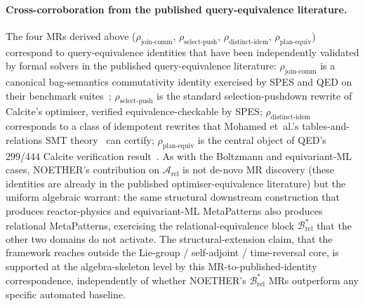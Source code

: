 \documentclass[manuscript]{acmart}
\begin{document}
\paragraph{Cross-corroboration from the published query-equivalence literature.}
The four MRs derived above ($\rho_{\mathrm{join\text{-}comm}}$, $\rho_{\mathrm{select\text{-}push}}$, $\rho_{\mathrm{distinct\text{-}idem}}$, $\rho_{\mathrm{plan\text{-}equiv}}$) correspond to query-equivalence identities that have been independently validated by formal solvers in the published query-equivalence literature: $\rho_{\mathrm{join\text{-}comm}}$ is a canonical bag-semantics commutativity identity exercised by SPES and QED on their benchmark suites~\cite{Wang2024QED, Zhou2022SPES}; $\rho_{\mathrm{select\text{-}push}}$ is the standard selection-pushdown rewrite of Calcite's optimiser, verified equivalence-checkable by SPES; $\rho_{\mathrm{distinct\text{-}idem}}$ corresponds to a class of idempotent rewrites that Mohamed et~al.'s tables-and-relations SMT theory~\cite{Mohamed2024SQLTables} can certify; $\rho_{\mathrm{plan\text{-}equiv}}$ is the central object of QED's 299/444 Calcite verification result~\cite{Wang2024QED}. As with the Boltzmann and equivariant-ML cases, NOETHER's contribution on $\mathcal{A}_{\mathrm{rel}}$ is not de-novo MR discovery (these identities are already in the published optimiser-equivalence literature) but the uniform algebraic warrant: the same structural downstream construction that produces reactor-physics and equivariant-ML MetaPatterns also produces relational MetaPatterns, exercising the relational-equivalence block $\mathcal{B}^{*}_{\mathrm{rel}}$ that the other two domains do not activate. The structural-extension claim, that the framework reaches outside the Lie-group / self-adjoint / time-reversal core, is supported at the algebra-skeleton level by this MR-to-published-identity correspondence, independently of whether NOETHER's $\mathcal{B}^{*}_{\mathrm{rel}}$ MRs outperform any specific automated baseline.
\end{document}
